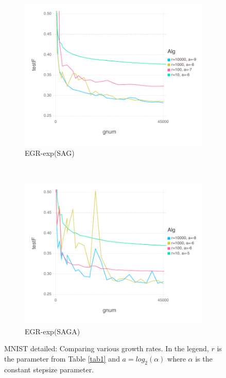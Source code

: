 \documentclass[11pt]{article}
\begin{document}
\begin{figure}[H]
       \begin{subfigure}[b]{0.45\textwidth}
           \includegraphics[width=\textwidth]{Figures/MNISTBLtrueffFinal-expfalse.pdf}
           \caption{EGR-exp(SAG)}
       \end{subfigure}
       ~ %
         \begin{subfigure}[b]{0.45\textwidth}
             \includegraphics[width=\textwidth]{Figures/MNISTBLtrueffFinal-exptrue.pdf}
             \caption{EGR-exp(SAGA)}
         \end{subfigure}
       \caption{MNIST detailed: Comparing various growth rates. In the legend, $r$ is the parameter from Table \ref{tab1} and $a=log_2(\alpha)$ where $\alpha$ is the constant stepsize parameter.}\label{fig:MNIST}
   \end{figure}
   
\end{document}
